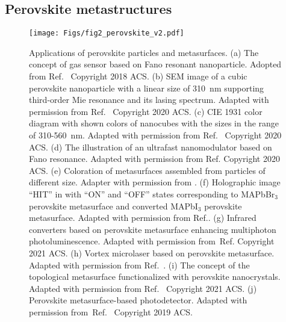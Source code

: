 \documentclass[journal=chreay,manuscript=review]{achemso}
\begin{document}


\subsection{Perovskite metastructures}



\begin{figure}[h!]
    \centering
    \texttt{[image: Figs/fig2\_perovskite\_v2.pdf]}
    \caption{
      Applications of perovskite particles and metasurfaces. (a) The concept of gas sensor based on Fano resonant nanoparticle. Adopted from Ref.~ Copyright 2018 ACS. (b) SEM image of a cubic perovskite nanoparticle with a linear size of 310~nm supporting third-order Mie resonance and its lasing spectrum. Adapted with permission from Ref.~ Copyright 2020 ACS. (c) CIE 1931 color diagram with shown colors of nanocubes with the sizes in the range of 310-560~nm. Adapted with permission from Ref.~ Copyright 2020 ACS. (d) The illustration of an ultrafast nanomodulator based on Fano resonance. Adapted with permission from Ref. Copyright 2020 ACS.
      (e) Coloration of metasurfaces assembled from particles of different size. Adapter with permission from . 
    (f) Holographic image “HIT” in with “ON” and “OFF” states corresponding to MAPbBr$_3$ perovskite metasurface and converted MAPbI$_3$ perovskite metasurface. Adapted with permission from Ref..
    (g) Infrared converters based on perovskite metasurface enhancing multiphoton photoluminescence. Adapted with permission from~Ref. Copyright 2021 ACS.
    (h) Vortex microlaser based on perovskite metasurface. Adapted with permission from Ref.~.
    (i) The concept of the topological metasurface functionalized with perovskite nanocrystals. Adapted with permission from  Ref.~ Copyright 2021 ACS.
   (j) Perovskite metasurface-based photodetector. Adapted with permission from~Ref.~ Copyright 2019 ACS. }
    \label{fig:pero2l}
\end{figure}
\end{document}

